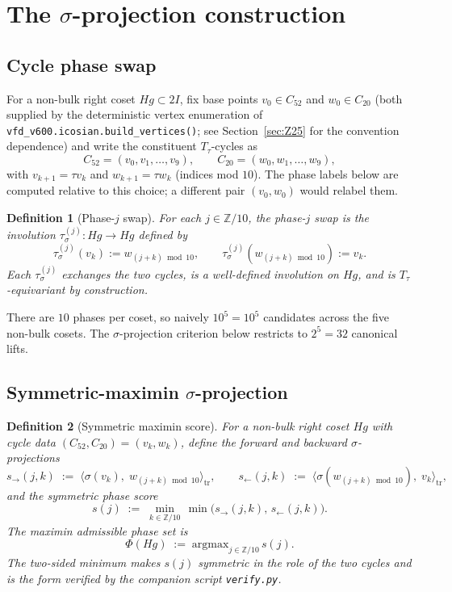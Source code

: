 \documentclass[11pt]{article}
\newtheorem{definition}{Definition}[section]
\newcommand{\twoI}{2I}
\newcommand{\sigmaG}{\sigma}
\newcommand{\tausigmaj}[1]{\tau^{(#1)}_{\!\sigmaG}}
\newcommand{\Ttau}{T_{\tau}}
\begin{document}
\section{The $\sigmaG$-projection construction}\label{sec:construction}

\subsection{Cycle phase swap}

For a non-bulk right coset $Hg \subset \twoI$, fix base points
$v_0 \in C_{52}$ and $w_0 \in C_{20}$ (both supplied by the
deterministic vertex enumeration of
\texttt{vfd\_v600.icosian.build\_vertices()}; see Section~\ref{sec:Z25}
for the convention dependence) and write the constituent
$\Ttau$-cycles as
\[
  C_{52} = (v_0, v_1, \ldots, v_9), \qquad
  C_{20} = (w_0, w_1, \ldots, w_9),
\]
with $v_{k+1} = \tau v_k$ and $w_{k+1} = \tau w_k$ (indices mod $10$).
The phase labels below are computed relative to this choice; a
different pair $(v_0, w_0)$ would relabel them.

\begin{definition}[Phase-$j$ swap]\label{def:phaseswap}
For each $j \in \mathbb{Z}/10$, the \emph{phase-$j$ swap} is the
involution $\tausigmaj{j} : Hg \to Hg$ defined by
\[
  \tausigmaj{j}(v_k) := w_{(j + k) \bmod 10}, \qquad
  \tausigmaj{j}(w_{(j + k) \bmod 10}) := v_k.
\]
Each $\tausigmaj{j}$ exchanges the two cycles, is a well-defined
involution on $Hg$, and is $\Ttau$-equivariant by construction.
\end{definition}

There are $10$ phases per coset, so naively $10^5 = 10^5$ candidates
across the five non-bulk cosets. The $\sigmaG$-projection criterion
below restricts to $2^5 = 32$ canonical lifts.

\subsection{Symmetric-maximin $\sigmaG$-projection}

\begin{definition}[Symmetric maximin score]\label{def:maximin}
For a non-bulk right coset $Hg$ with cycle data
$(C_{52}, C_{20}) = (v_k, w_k)$, define the forward and backward
$\sigmaG$-projections
\[
  s_{\to}(j,k) \;:=\; \langle \sigmaG(v_k),\; w_{(j+k) \bmod 10} \rangle_{\mathrm{tr}},
  \qquad
  s_{\leftarrow}(j,k) \;:=\; \langle \sigmaG(w_{(j+k) \bmod 10}),\; v_k \rangle_{\mathrm{tr}},
\]
and the \emph{symmetric phase score}
\[
  s(j) \;:=\; \min_{k \in \mathbb{Z}/10}\,
  \min\bigl(s_{\to}(j,k),\, s_{\leftarrow}(j,k)\bigr).
\]
The \emph{maximin admissible phase set} is
\[
  \Phi(Hg) \;:=\; \mathrm{argmax}_{j \in \mathbb{Z}/10}\, s(j).
\]
The two-sided minimum makes $s(j)$ symmetric in the role of the two
cycles and is the form verified by the companion script
\texttt{verify.py}.
\end{definition}
\end{document}
